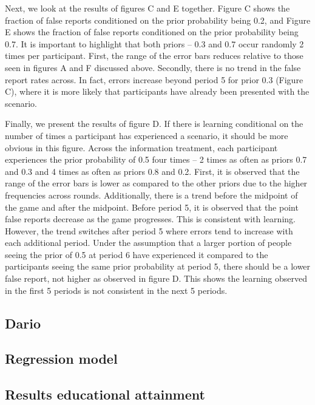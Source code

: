 \documentclass[12pt,a4paper]{article}
\begin{document}
	\hspace *{0mm} Next, we look at the results of figures C and E together. Figure C shows the fraction of false reports conditioned on the prior probability being 0.2, and Figure E shows the fraction of false reports conditioned on the prior probability being 0.7. It is important to highlight that both priors – 0.3 and 0.7 occur randomly 2 times per participant. First, the range of the error bars reduces relative to those seen in figures A and F discussed above. Secondly, there is no trend in the false report rates across. In fact, errors increase beyond period 5 for prior 0.3 (Figure C), where it is more likely that participants have already been presented with the scenario.
	
	\hspace *{0mm} Finally, we present the results of figure D. If there is learning conditional on the number of times a participant has experienced a scenario, it should be more obvious in this figure. Across the information treatment, each participant experiences the prior probability of 0.5 four times – 2 times as often as priors 0.7 and 0.3 and 4 times as often as priors 0.8 and 0.2. First, it is observed that the range of the error bars is lower as compared to the other priors due to the higher frequencies across rounds. Additionally, there is a trend before the midpoint of the game and after the midpoint. Before period 5, it is observed that the point false reports decrease as the game progresses. This is consistent with learning. However, the trend switches after period 5 where errors tend to increase with each additional period. Under the assumption that a larger portion of people seeing the prior of 0.5 at period 6 have experienced it compared to the participants seeing the same prior probability at period 5, there should be a lower false report, not higher as observed in figure D. This shows the learning observed in the first 5 periods is not consistent in the next 5 periods. 
	
	\subsection{Dario}
	
	
	
	\subsection{Regression model}
	
	
	
	\subsection{Results educational attainment}
	
\end{document}
